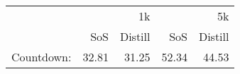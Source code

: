 \begin{tabular}{lrrrr}
\toprule
 & \multicolumn{2}{r}{1k} & \multicolumn{2}{r}{5k} \\
 & SoS & Distill & SoS & Distill \\
\midrule
Countdown: & 32.81 & 31.25 & 52.34 & 44.53 \\
\bottomrule
\end{tabular}

